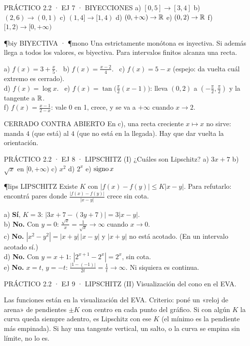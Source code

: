 \begin{enunciado}{PRÁCTICO 2.2 · EJ 7 · BIYECCIONES}
a) $[0,5]\to[3,4]$ b) $(2,6)\to(0,1)$ c) $(1,4]\to[1,4)$ d) $(0,+\infty)\to\mathbb{R}$ e) $(0,2)\to\mathbb{R}$ f) $[1,2)\to[0,+\infty)$
\end{enunciado}
\begin{uso}{\P{biy} BIYECTIVA · \P{mono}}
Una estrictamente monótona es inyectiva. Si además llega a todos los valores, es biyectiva. Para intervalos finitos alcanza una recta.
\end{uso}
a) $f(x)=3+\frac x5$. \ b) $f(x)=\frac{x-2}4$. \ c) $f(x)=5-x$ (espejo: da vuelta cuál extremo es cerrado).\\
d) $f(x)=\log x$. \ e) $f(x)=\tan\big(\frac\pi2(x-1)\big)$: lleva $(0,2)$ a $(-\frac\pi2,\frac\pi2)$ y la tangente a $\mathbb{R}$.\\
f) $f(x)=\frac{x-1}{2-x}$: vale 0 en 1, crece, y se va a $+\infty$ cuando $x\to2$.
\begin{trampa}{CERRADO CONTRA ABIERTO}
En c), una recta creciente $x\mapsto x$ no sirve: manda $4$ (que está) al $4$ (que no está en la llegada). Hay que dar vuelta la orientación.
\end{trampa}

\begin{enunciado}{PRÁCTICO 2.2 · EJ 8 · LIPSCHITZ (I)}
¿Cuáles son Lipschitz? a) $3x+7$ b) $\sqrt x$ en $[0,+\infty)$ c) $x^2$ d) $2^x$ e) $\operatorname{signo} x$
\end{enunciado}
\begin{uso}{\P{lips} LIPSCHITZ}
Existe $K$ con $|f(x)-f(y)|\le K|x-y|$. Para refutarlo: encontrá pares donde $\frac{|f(x)-f(y)|}{|x-y|}$ crece sin cota.
\end{uso}
a) \textbf{Sí}, $K=3$: $|3x+7-(3y+7)|=3|x-y|$.\\
b) \textbf{No.} Con $y=0$: $\frac{\sqrt x}x=\frac1{\sqrt x}\to\infty$ cuando $x\to0$.\\
c) \textbf{No.} $|x^2-y^2|=|x+y|\,|x-y|$ y $|x+y|$ no está acotado. (En un intervalo acotado sí.)\\
d) \textbf{No.} Con $y=x+1$: $|2^{x+1}-2^x|=2^x$, sin cota.\\
e) \textbf{No.} $x=t$, $y=-t$: $\frac{|1-(-1)|}{2t}=\frac1t\to\infty$. Ni siquiera es continua.

\begin{enunciado}{PRÁCTICO 2.2 · EJ 9 · LIPSCHITZ (II)}
Visualización del cono en el EVA.
\end{enunciado}
\begin{falta}
Las funciones están en la visualización del EVA. Criterio: poné un «reloj de arena» de pendientes $\pm K$ con centro en cada punto del gráfico. Si con algún $K$ la curva queda siempre adentro, es Lipschitz con ese $K$ (el mínimo es la pendiente más empinada). Si hay una tangente vertical, un salto, o la curva se empina sin límite, no lo es.
\end{falta}

